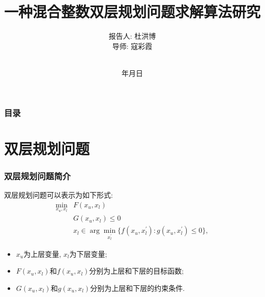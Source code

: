 \documentclass{beamer}
\renewcommand{\today}{\number\year 年\number\month 月\number\day 日}
\begin{document}
\justifying
\title[一种混合整数双层规划问题求解算法研究]%
{一种混合整数双层规划问题求解算法研究}

\author[杜洪博]%
{报告人: 杜洪博\\
导\quad 师: 寇彩霞\rule[0pt]{0pt}{20pt}\\}

\institute[BUPT]{\textcolor[rgb]{0.0,0.0,0.10}%
{\small\ttfamily 北京邮电大学\ 理学院\\[10pt]}}

\date{\today}

\begin{frame}[plain]
	\titlepage
\end{frame}

\begin{frame}
	\frametitle{目录}
	\tableofcontents[hideallsubsections] %
\end{frame}

\AtBeginSection[] %
{ \begin{frame}<beamer> %
		\tableofcontents[currentsection,hideallsubsections]%
	\end{frame}
}


\section{双层规划问题}

\begin{frame}
	\frametitle{双层规划问题简介}
	双层规划问题可以表示为如下形式: 
	\begin{equation}
		\begin{aligned}
			\min_{x_u,x_l}& F(x_u,x_l)  \\
			&G(x_u,x_l)\leq0 \\
			&x_l\in\arg\operatorname*{min}_{x_l^{\prime}}\{f(x_u,x_l^{\prime}):g(x_u,x_l^{\prime})\leq0\},
		\end{aligned}
	\end{equation}
	\begin{itemize}
		\item $x_u$为上层变量, $x_l$为下层变量;
		\item $F(x_u,x_l)$和$f(x_u,x_l)$分别为上层和下层的目标函数;
		\item $G(x_u,x_l)$和$g(x_u,x_l)$分别为上层和下层的约束条件.
	\end{itemize}
\end{frame}
\end{document}
